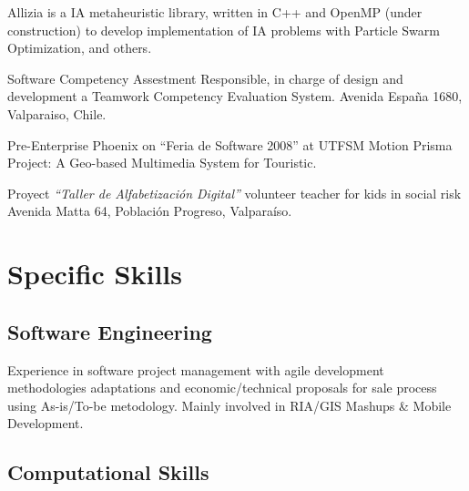 \documentclass[11pt,letterpaper,roman]{moderncv}
\begin{document}
	
	{Allizia is a IA metaheuristic library, written in C++ and OpenMP (under
	construction) to develop implementation of IA problems with Particle Swarm Optimization, and others.}

	 { } {} {}
	{Software Competency Assestment Responsible, in charge of design
	and development a Teamwork Competency Evaluation System. Avenida Espa\~na 1680,
	Valparaiso, Chile.}

	 {\sd} { } {} {}
	{Pre-Enterprise Phoenix on ``Feria de Software 2008'' at \textsc{UTFSM}
	Motion Prisma Project: A Geo-based Multimedia System for Touristic.}

	 {\tchr} {\ernestoquiroz } {\valpo} {}
	{Proyect \textit{``Taller de Alfabetizaci\'on Digital''} volunteer
	teacher for kids in social risk Avenida Matta 64, Poblaci\'on Progreso,
	Valpara\'iso.}
	
%

 

\section{Specific Skills}
	\subsection{Software Engineering}
		{Experience in software project management with agile development
		methodologies adaptations and economic/technical proposals for sale process
		using As-is/To-be metodology. Mainly involved in RIA/GIS Mashups \& Mobile Development.}
		
	\subsection{Computational Skills}
\end{document}
